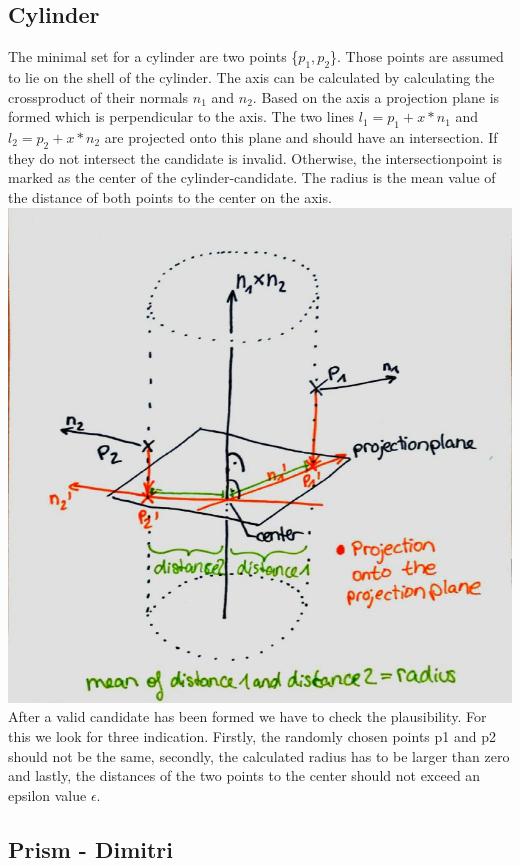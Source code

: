 \documentclass[../ClassicThesis.tex]{subfiles}
\begin{document}
\subsection{Cylinder}
The minimal set for a cylinder are two points \{$p_1, p_2$\}. Those points are assumed to lie on the shell of the cylinder. The axis can be calculated by calculating the crossproduct of their normals $n_1$ and $n_2$. Based on the axis a projection plane is formed which is perpendicular to the axis. The two lines $l_1 = p_1 + x*n_1$ and $l_2 = p_2 + x*n_2$ are projected onto this plane and should have an intersection. If they do not intersect the candidate is invalid. Otherwise, the intersectionpoint is marked as the center of the cylinder-candidate. The radius is the mean value of the distance of both points to the center on the axis.\\
\includegraphics[width=\columnwidth]{Images/10-classifiers-cylinderClassification.jpg}
After a valid candidate has been formed we have to check the plausibility. For this we look for three indication. Firstly, the randomly chosen points p1 and p2 should not be the same, secondly, the calculated radius has to be larger than zero and lastly, the distances of the two points to the center should not exceed an epsilon value $\epsilon$.
\subsection{Prism - Dimitri}
\end{document}
